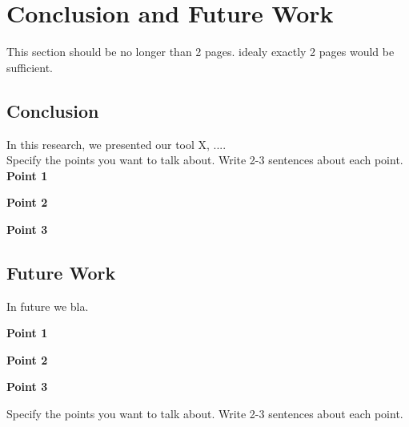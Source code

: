 \chapter{Conclusion and Future Work}
\label{chapter:Conclusion_and_Future_Work}
This section should be no longer than 2 pages. idealy exactly 2 pages would be sufficient.

\section{Conclusion} 
In this research, we presented our tool X, .... \\

Specify the points you want to talk about. Write 2-3 sentences about each point. \\

\textbf{Point 1}

\textbf{Point 2}

\textbf{Point 3}

\section{Future Work} 

In future we bla.

\textbf{Point 1}

\textbf{Point 2}

\textbf{Point 3}

Specify the points you want to talk about. Write 2-3 sentences about each point. \\